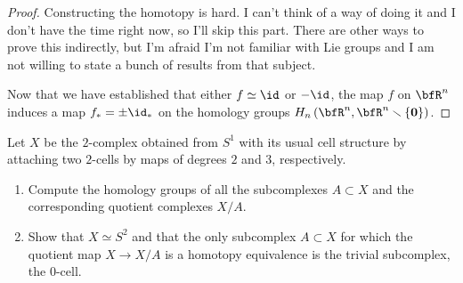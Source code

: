 \begin{proof}
Constructing the homotopy is hard. I can't think of a way of doing it and I
don't have the time right now, so I'll skip this part. There are other ways
to prove this indirectly, but I'm afraid I'm not familiar with Lie groups
and I am not willing to state a bunch of results from that subject.

Now that we have established that either $f\simeq \id$ or $-\id$, the map
$f$ on $\bfR^n$ induces a map $f_*=\pm\id_*$ on the homology groups
$H_n\left(\bfR^n,\bfR^n\smallsetminus\{\mathbf{0}\}\right)$.
\end{proof}
\newpage

\begin{problem}[Hatcher {\S}2.2, Ex.\@ 13]
Let $X$ be the $2$-complex obtained from $S^1$ with its usual cell
structure by attaching two $2$-cells by maps of degrees $2$ and $3$,
respectively.
\begin{enumerate}[label=(\alph*)]
\item Compute the homology groups of all the subcomplexes $A\subset X$ and
  the corresponding quotient complexes $X/A$.
\item Show that $X\simeq S^2$ and that the only subcomplex $A\subset X$ for
  which the quotient map $X\to X/A$ is a homotopy equivalence is the
  trivial subcomplex, the $0$-cell.
\end{enumerate}
\end{problem}
